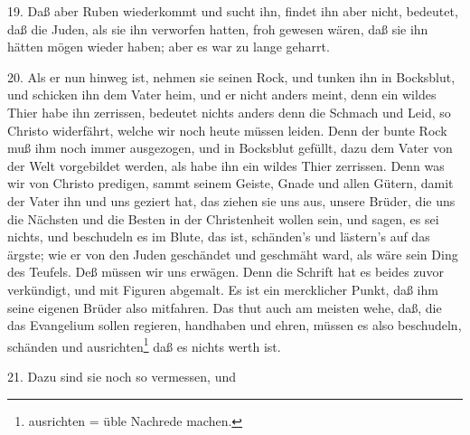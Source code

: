 19. Daß aber Ruben wiederkommt und sucht ihn, findet ihn aber nicht, bedeutet, daß die Juden, als sie ihn verworfen hatten, froh gewesen wären, daß sie ihn hätten mögen wieder haben; aber es war zu lange geharrt.

20. Als er nun hinweg ist, nehmen sie seinen Rock, und tunken ihn in Bocksblut, und schicken ihn dem Vater heim, und er nicht anders meint, denn ein wildes Thier habe ihn zerrissen, bedeutet nichts anders denn die Schmach und Leid, so Christo widerfährt, welche wir noch heute müssen leiden. Denn der bunte Rock muß ihm noch immer ausgezogen, und in Bocksblut gefüllt, dazu dem Vater von der Welt vorgebildet werden, als habe ihn ein wildes Thier zerrissen. Denn was wir von Christo predigen, sammt seinem Geiste, Gnade und allen Gütern, damit der Vater ihn und uns geziert hat, das ziehen sie uns aus, unsere Brüder, die uns die Nächsten und die Besten in der Christenheit wollen sein, und sagen, es sei nichts, und beschudeln es im Blute, das ist, schänden’s und lästern’s auf das ärgste; wie er von den Juden geschändet und geschmäht ward, als wäre sein Ding des Teufels. Deß müssen wir uns erwägen. Denn die Schrift hat es beides zuvor verkündigt, und mit Figuren abgemalt. Es ist ein mercklicher Punkt, daß ihm seine eigenen Brüder also mitfahren. Das thut auch am meisten wehe, daß, die das Evangelium sollen regieren, handhaben und ehren, müssen es also beschudeln, schänden und ausrichten\footnote{ausrichten = üble Nachrede machen.} daß es nichts werth ist.

21. Dazu sind sie noch so vermessen, und
